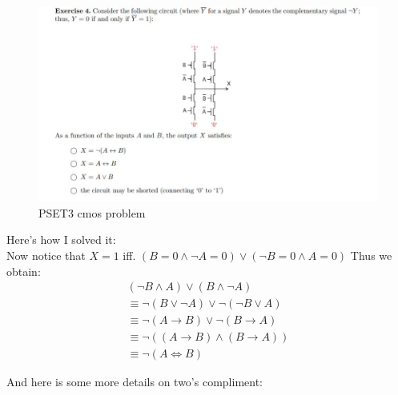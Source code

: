 \documentclass[titlepage]{article}
\theoremstyle{definition}
\numberwithin{equation}{subsection}
\numberwithin{remark}{subsection}
\begin{document}
\begin{figure}[H]
    \centering
    \includegraphics[scale=0.7]{epflLectureNotes/advancedComputation/figures/cmos2.JPG}
    \caption{PSET3 cmos problem}
    \label{fig:my_label}
\end{figure}

Here's how I solved it:
\\
Now notice that $X=1$ iff. $(B=0 \land \neg A = 0) \lor (\neg B = 0 \land A = 0)$ Thus we obtain:
\begin{align*}
    (\neg B \land A) \lor (B \land \neg A)\\
    \equiv \neg(B\lor \neg A) \lor \neg(\neg B \lor A)\\
    \equiv \neg(A \rightarrow B) \lor \neg(B \rightarrow A)\\
    \equiv \neg ((A \rightarrow B) \land (B \rightarrow A))\\
    \equiv \neg (A \iff B)
\end{align*}
\clearpage


And here is some more details on two's compliment:
\end{document}
